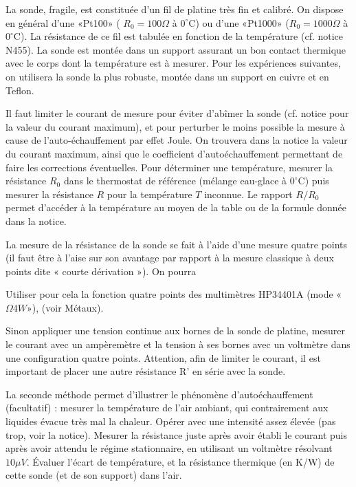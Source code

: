 \documentclass{article}%
\begin{document}
La sonde, fragile, est constituée d'un fil de platine très fin et calibré. On dispose en général d'une «Pt100» ( $R_{0} = 100 \Omega$ à $0^{\circ}\textrm{C}$) ou d'une «Pt1000» ($R_{0}=1000 \Omega$ à $0^{\circ}\textrm{C}$). La résistance de ce fil est tabulée en fonction de la température (cf. notice N455). La sonde est montée dans un support assurant un bon contact thermique avec le corps dont la température est à mesurer. Pour les expériences suivantes, on utilisera la sonde la plus robuste, montée dans un support en cuivre et en Teflon.

Il faut limiter le courant de mesure pour éviter d'abîmer la sonde (cf. notice pour la valeur du courant maximum), et pour perturber le moins possible la mesure à cause de l'auto-échauffement par effet Joule. On trouvera dans la notice la valeur du courant maximum, ainsi que le coefficient d'autoéchauffement permettant de faire les corrections éventuelles. Pour déterminer une température, mesurer la résistance $R_{0}$ dans le thermostat de référence (mélange eau-glace à $0^{\circ}\textrm{C}$) puis mesurer la résistance $R$ pour la température $T$ inconnue. Le rapport $R/R_{0}$ permet d'accéder à la température au moyen de la table ou de la formule donnée dans la notice.

La mesure de la résistance de la sonde se fait à l'aide d'une mesure quatre points (il faut être à l'aise sur son avantage par rapport à la mesure classique à deux points dite « courte dérivation »). On pourra

Utiliser pour cela la fonction quatre points des multimètres HP34401A (mode « $\Omega4W$»), (voir Métaux).

 Sinon appliquer une tension continue aux bornes de la sonde de platine, mesurer le courant avec un ampèremètre et la tension à ses bornes avec un voltmètre dans une configuration quatre points. Attention, afin de limiter le courant, il est important de placer une autre résistance R' en série avec la sonde.

La seconde méthode permet d'illustrer le phénomène d'autoéchauffement (facultatif) : mesurer la température de l'air ambiant, qui contrairement aux liquides évacue très mal la chaleur. Opérer avec une intensité assez élevée (pas trop, voir la notice). Mesurer la résistance juste après avoir établi le courant puis après avoir attendu le régime stationnaire, en utilisant un voltmètre résolvant $10 \mu V$. Évaluer l'écart de température, et la résistance thermique (en K/W) de cette sonde (et de son support) dans l'air. 
\end{document}
